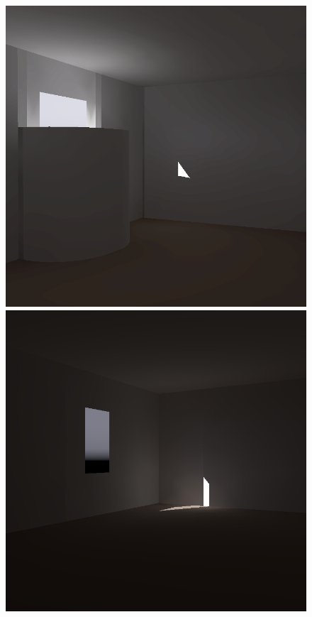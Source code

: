 \begin{figure}[t]
\includegraphics[width=\figwidth]{p3r_N2_march_chris.png} \hfill
\includegraphics[width=\figwidth]{p3r_PRE_N6_march_chris.png}

\end{figure}
